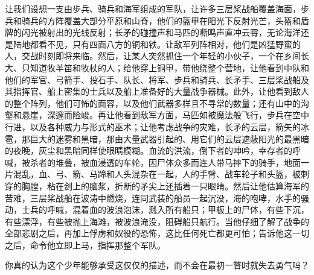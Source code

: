 让我们设想一支由步兵、骑兵和海军组成的军队，让许多三层桨战船覆盖海面，步兵和骑兵的方阵覆盖大部分平原和山脊，他们的盔甲在阳光下反射光芒，头盔和盾牌的闪光被射出的光线反射；长矛的碰撞声和马匹的嘶鸣声直冲云霄，无论海洋还是陆地都看不见，只有四面八方的铜和铁。让敌军列阵相对，他们是凶猛野蛮的人，交战时刻即将来临。然后，让某人突然抓住一个年轻的小伙子，一个在乡间长大、只知道牧羊笛和牧杖的人；给他穿上铜甲，带他绕整个营地，让他看到中队和他们的军官、弓箭手、投石手、队长、将军、步兵和骑兵、长矛手、三层桨战船及其指挥官、船上密集的士兵以及船上准备好的大量战争器械。此外，让他看到敌人的整个阵列，他们可怖的面容，以及他们武器多样且不寻常的数量；还有山中的沟壑和悬崖，深邃而险峻。再让他看到敌军方面，马匹如被魔法般飞行，步兵在空中行进，以及各种威力与形式的巫术；让他考虑战争的灾难，长矛的云层，箭矢的冰雹，那巨大的迷雾和黑暗，那由大量武器引起的、用它们的云层遮蔽阳光的最黑暗的夜晚，灰尘和黑暗同样使眼睛模糊。血流的洪流，倒下者的呻吟，幸存者的呼喊，被杀者的堆叠，被血浸透的车轮，因尸体众多而连人带马摔下的骑手，地面一片混乱，血、弓、箭、马蹄和人头混杂在一起，人的手臂、战车轮子和头盔，被刺穿的胸膛，粘在剑上的脑浆，折断的矛尖上还插着一只眼睛。然后让他估算海军的苦难，三层桨战船在波涛中燃烧，连同武装的船员一起沉没，海的咆哮，水手的骚动，士兵的呼喊，混着血的波浪泡沫，溅入所有船只；甲板上的尸体，有些下沉，有些漂浮，有些被抛上海滩，被波浪淹没，阻碍船只航行。当他仔细了解了战争的全部悲剧之后，再加上俘虏和奴役的恐怖，这比任何死亡都更可怕；告诉他这一切之后，命令他立即上马，指挥那整个军队。\par

你真的认为这个少年能够承受这仅仅的描述，而不会在最初一瞥时就失去勇气吗？\par

